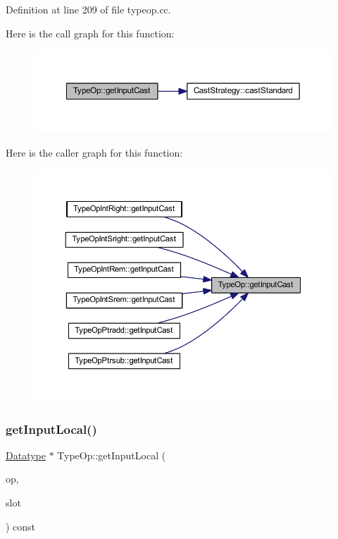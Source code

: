 Definition at line 209 of file typeop.\+cc.

Here is the call graph for this function\+:
\nopagebreak
\begin{figure}[H]
\begin{center}
\leavevmode
\includegraphics[width=350pt]{class_type_op_a950c417e4af100d176a701af5816b5ab_cgraph}
\end{center}
\end{figure}
Here is the caller graph for this function\+:
\nopagebreak
\begin{figure}[H]
\begin{center}
\leavevmode
\includegraphics[width=350pt]{class_type_op_a950c417e4af100d176a701af5816b5ab_icgraph}
\end{center}
\end{figure}
\mbox{\label{class_type_op_abe2e4b619932cf94bafb084963a0fc66}} 
\subsubsection{\texorpdfstring{getInputLocal()}{getInputLocal()}}
{\footnotesize\ttfamily \mbox{\hyperlink{class_datatype}{Datatype}} $\ast$ Type\+Op\+::get\+Input\+Local (\begin{DoxyParamCaption}\item[{const \mbox{\hyperlink{class_pcode_op}{Pcode\+Op}} $\ast$}]{op,  }\item[{int4}]{slot }\end{DoxyParamCaption}) const\hspace{0.3cm}{\ttfamily [virtual]}}



